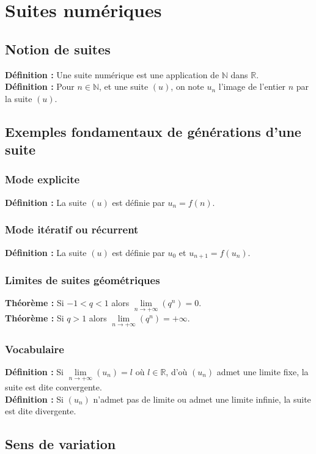 \documentclass[a4paper,titlepage]{article}
\let\oldsection\section
\renewcommand\section{\clearpage\oldsection}
\begin{document}
\section{Suites numériques}
    \subsection{Notion de suites}
        \textbf{Définition :} Une suite numérique est une application de $\mathbb{N}$ dans $\mathbb{R}$.
        \\
        \textbf{Définition :} Pour $n\in\mathbb{N}$, et une suite $\left(u\right)$, on note $u_{n}$ l’image de l’entier $n$ par la suite $\left(u\right)$.
    \subsection{Exemples fondamentaux de générations d’une suite}
        \subsubsection{Mode explicite}
            \textbf{Définition :} La suite $\left(u\right)$ est définie par $u_{n}=f\left(n\right)$.
        \subsubsection{Mode itératif ou récurrent}
            \textbf{Définition :} La suite $\left(u\right)$ est définie par $u_{0}$ et $u_{n+1}=f\left(u_{n}\right)$.
        \subsubsection{Limites de suites géométriques}
            \textbf{Théorème :} Si $-1<q<1$ alors $\lim\limits_{n\to+\infty}\left(q^{n}\right)=0$.
            \\
            \textbf{Théorème :} Si $q>1$ alors $\lim\limits_{n\to+\infty}\left(q^{n}\right)=+\infty$.
        \subsubsection{Vocabulaire}
            \textbf{Définition :} Si $\lim\limits_{n\to+\infty}\left(u_{n}\right)=l$ où $l\in\mathbb{R}$, d’où $\left(u_{n}\right)$ admet une limite fixe, la suite est dite convergente.
            \\
            \textbf{Définition :} Si $\left(u_{n}\right)$ n’admet pas de limite ou admet une limite infinie, la suite est dite divergente.
    \subsection{Sens de variation}
\end{document}
